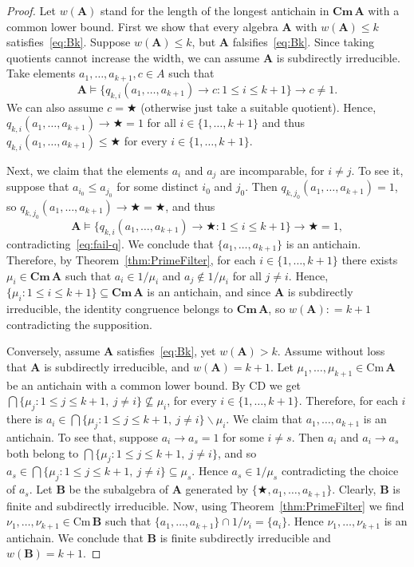 \documentclass[10pt,a4paper]{amsart}
\def\op{\bigstar}
\def\ra{\rightarrow}
\newcommand{\Cm}[1]{\mathbf{Cm}\, #1}
\newcommand{\alg}[1]{\mathbf{#1}}
\newcommand{\cm}[1]{\mathrm{Cm}\, #1}
\newcommand{\deq}{\mathrel{\mathop:}=}
\begin{document}
\begin{proof}
Let $w(\alg{A})$ stand for the length of the longest
antichain in $\Cm{\alg{A}}$ with a common lower bound.
First we show that every 
algebra $\alg{A}$ with $w(\alg{A})\leq k$ satisfies~\eqref{eq:Bk}. 
Suppose $w(\alg{A}) \leq k$, but $\alg{A}$ falsifies~\eqref{eq:Bk}.
Since taking quotients cannot increase the width, we can assume 
$\alg{A}$ is subdirectly irreducible. Take elements
$a_1,\dots,a_{k+1},c\in A$ such that
\begin{equation}\label{eq:fail-q}\tag{\dag}
\alg{A}\models
\{q_{k,i}(a_1,\dots,a_{k+1})\ra c:1\leq i\leq k+1\}\ra c\neq 1.
\end{equation}
We can also assume $c = \op$ (otherwise just take a suitable quotient).
Hence, $q_{k,i}(a_1,\dots,a_{k+1})\ra \op = 1$
for all $i\in\{1,\dots,k+1\}$ and thus $q_{k,i}(a_1,\dots,a_{k+1})\leq\op$
for every $i\in\{1,\dots,k+1\}$.

Next, we claim that the elements $a_i$ and $a_j$ are incomparable, for $i\neq j$.
To see it, suppose that $a_{i_0}\leq a_{j_0}$ for some
distinct $i_0$ and $j_0$. Then
$q_{k,{j_0}}(a_1,\dots,a_{k+1}) = 1$, so 
$q_{k,{j_0}}(a_1,\dots,a_{k+1})\ra\op = \op$, and thus
$$
\alg{A}\models
\{q_{k,i}(a_1,\dots,a_{k+1})\ra \op:1\leq i\leq k+1\}\ra \op = 1,
$$
contradicting~\eqref{eq:fail-q}.
We conclude that $\{a_1,\dots,a_{k+1}\}$ is an antichain.
Therefore, by Theorem~\ref{thm:PrimeFilter},
for each $i\in\{1,\dots,k+1\}$ there exists
$\mu_i\in \Cm{\alg{A}}$ such that $a_i\in 1/\mu_i$ and
$a_j\notin 1/\mu_i$ for all $j\neq i$. Hence,
$\{\mu_i: 1\leq i\leq k+1\}\subseteq\Cm{\alg{A}}$ is an antichain,
and since $\alg{A}$ is subdirectly irreducible, the identity congruence
belongs to $\Cm{\alg{A}}$, so $w(\alg{A}) \deq k+1$ contradicting the supposition.


Conversely, assume $\alg{A}$ satisfies~\eqref{eq:Bk}, yet $w(\alg{A})> k$.  
Assume without loss that $\alg{A}$ is subdirectly irreducible,
and $w(\alg{A}) = k+1$. Let $\mu_1,\dots,\mu_{k+1}\in\cm{\alg{A}}$ be an
antichain with a common lower bound. By CD we get
$\bigcap\{\mu_j: 1\leq j\leq k+1, \ j\neq i\} \not\subseteq \mu_i$,
for every $i\in \{1,\dots,k+1\}$. Therefore,
for each $i$ there is $a_i\in
\bigcap\{\mu_j: 1\leq j\leq k+1, \ j\neq i\}\smallsetminus \mu_i$. We claim that 
$a_1,\dots,a_{k+1}$ is an antichain. To see that,
suppose $a_i\ra a_s = 1$ for some $i\neq s$.
Then $a_i$ and $a_i\ra a_s$ both belong to
$\bigcap\{\mu_j: 1\leq j\leq k+1, \ j\neq i\}$, and so
$a_s\in \bigcap\{\mu_j: 1\leq j\leq k+1, \ j\neq i\}\subseteq \mu_s$.
Hence $a_s\in 1/\mu_s$ contradicting the choice of $a_s$.
Let $\alg{B}$ be the subalgebra of $\alg{A}$  generated by
$\{\op,a_1,\dots,a_{k+1}\}$. Clearly, $\alg{B}$ is finite and subdirectly
irreducible. Now, using Theorem~\ref{thm:PrimeFilter} 
we find $\nu_1,\dots,\nu_{k+1}\in \cm{\alg{B}}$ such that
$\{a_1,\dots,a_{k+1}\}\cap 1/\nu_i = \{a_i\}$. 
Hence $\nu_1,\dots,\nu_{k+1}$ is an antichain. 
We conclude that $\alg{B}$ is finite subdirectly irreducible and
$w(\alg{B}) = k+1$. 


\end{proof}
\end{document}
